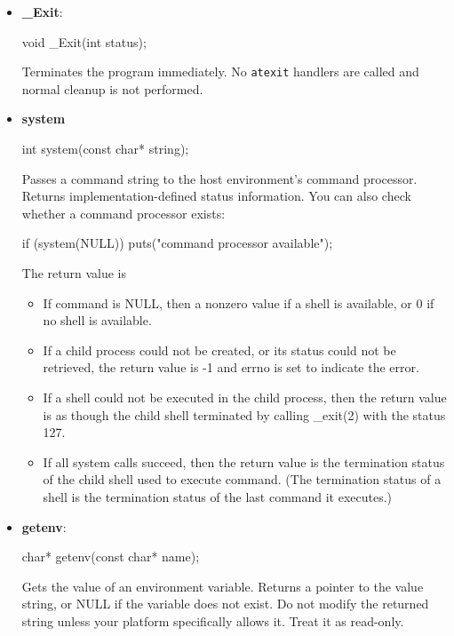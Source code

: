 \documentclass{report}
\begin{document}
\begin{itemize}
\begin{itemize}
            \end{itemize}
        \item \textbf{\_Exit}:
            \bigbreak \noindent 
            \begin{cppcode}
            void _Exit(int status);
            \end{cppcode}
            \bigbreak \noindent 
            Terminates the program immediately. No \texttt{atexit} handlers are called and normal cleanup is not performed.
        \item \textbf{system}
            \bigbreak \noindent 
            \begin{cppcode}
            int system(const char* string);
            \end{cppcode}
            \bigbreak \noindent 
            Passes a command string to the host environment’s command processor.
            \bigbreak \noindent 
            Returns implementation-defined status information.
            \bigbreak \noindent 
            You can also check whether a command processor exists:
            \bigbreak \noindent 
            \begin{cppcode}
                if (system(NULL)) {
                    puts("command processor available");
                }
            \end{cppcode}
            The return value is 
            \begin{itemize}
                \item If command is NULL, then a nonzero value if a shell is available, or 0 if no shell is available.
                \item  If a child process could not be created, or its status could not be retrieved, the return value is -1 and errno is set to indicate the error.
                \item If a shell could not be executed in the child process, then the return value is as though the child shell terminated by calling \_exit(2) with the status 127.
                \item  If all system calls succeed, then the return value is the termination status of the child shell used to execute command. (The termination status of a shell is the termination status of the last command it executes.)
            \end{itemize}
        \item \textbf{getenv}: 
            \bigbreak \noindent 
            \begin{cppcode}
            char* getenv(const char* name);
            \end{cppcode}
            \bigbreak \noindent 
            Gets the value of an environment variable.
            \bigbreak \noindent 
            Returns a pointer to the value string, or NULL if the variable does not exist.
            \bigbreak \noindent 
            Do not modify the returned string unless your platform specifically allows it. Treat it as read-only.

    \end{itemize}
\end{document}
